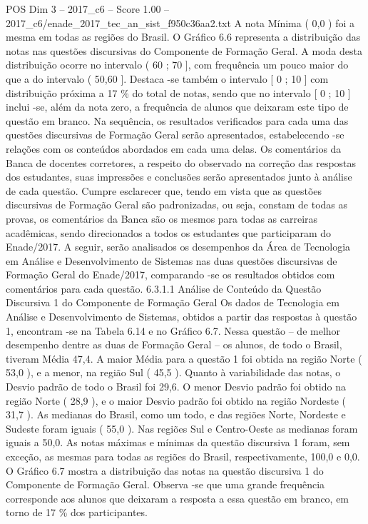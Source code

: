 \begin{textsample}{POS Dim 3 – 2017\_c6 – Score 1.00 – 2017\_c6/enade\_2017\_tec\_an\_sist\_f950c36aa2.txt}
A nota Mínima ( 0,0 ) foi a mesma em todas as regiões do Brasil.
O Gráfico 6.6 representa a distribuição das notas nas questões discursivas do Componente de Formação Geral.
A moda desta distribuição ocorre no intervalo ( 60 ; 70 ], com frequência um pouco maior do que a do intervalo ( 50,60 ].
Destaca -se também o intervalo [ 0 ; 10 ] com distribuição próxima a 17 \% do total de notas, sendo que no intervalo [ 0 ; 10 ] inclui -se, além da nota zero, a frequência de alunos que deixaram este tipo de questão em branco.
Na sequência, os resultados verificados para cada uma das questões discursivas de Formação Geral serão apresentados, estabelecendo -se relações com os conteúdos abordados em cada uma delas.
Os comentários da Banca de docentes corretores, a respeito do observado na correção das respostas dos estudantes, suas impressões e conclusões serão apresentados junto à análise de cada questão.
Cumpre esclarecer que, tendo em vista que as questões discursivas de Formação Geral são padronizadas, ou seja, constam de todas as provas, os comentários da Banca são os mesmos para todas as carreiras acadêmicas, sendo direcionados a todos os estudantes que participaram do Enade/2017.
A seguir, serão analisados os desempenhos da Área de Tecnologia em Análise e Desenvolvimento de Sistemas nas duas questões discursivas de Formação Geral do Enade/2017, comparando -se os resultados obtidos com comentários para cada questão. 6.3.1.1 Análise de Conteúdo da Questão Discursiva 1 do Componente de Formação Geral Os dados de Tecnologia em Análise e Desenvolvimento de Sistemas, obtidos a partir das respostas à questão 1, encontram -se na Tabela 6.14 e no Gráfico 6.7.
Nessa questão – de melhor desempenho dentre as duas de Formação Geral – os alunos, de todo o Brasil, tiveram Média 47,4.
A maior Média para a questão 1 foi obtida na região Norte ( 53,0 ), e a menor, na região Sul ( 45,5 ).
Quanto à variabilidade das notas, o Desvio padrão de todo o Brasil foi 29,6.
O menor Desvio padrão foi obtido na região Norte ( 28,9 ), e o maior Desvio padrão foi obtido na região Nordeste ( 31,7 ).
As medianas do Brasil, como um todo, e das regiões Norte, Nordeste e Sudeste foram iguais ( 55,0 ).
Nas regiões Sul e Centro-Oeste as medianas foram iguais a 50,0.
As notas máximas e mínimas da questão discursiva 1 foram, sem exceção, as mesmas para todas as regiões do Brasil, respectivamente, 100,0 e 0,0.
O Gráfico 6.7 mostra a distribuição das notas na questão discursiva 1 do Componente de Formação Geral.
Observa -se que uma grande frequência corresponde aos alunos que deixaram a resposta a essa questão em branco, em torno de 17 \% dos participantes.

\end{textsample}
